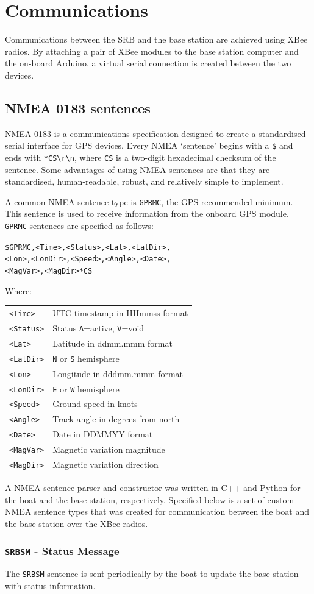 \documentclass[a4paper]{IEEEtran}
\newenvironment{nmeaspec}[1]
{
\newcommand{\field}[2]{\texttt{##1} & ##2 \\}
\vspace{0.2cm}
\noindent\texttt{#1}
\vspace{0.2cm}

\noindent Where: \vspace{0.1cm}\\  \noindent
\vspace{0.2cm}
\begin{tabular}{ll}
}
{
\end{tabular}
}
\begin{document}
\section{Communications}
Communications between the SRB and the base station are achieved using XBee radios. By attaching a pair of XBee modules to the base station computer and the on-board Arduino, a virtual serial connection is created between the two devices.

\subsection{NMEA 0183 sentences}
NMEA 0183 is a communications specification designed to create a standardised serial interface for GPS devices. Every NMEA `sentence' begins with a \texttt{\$} and ends with \texttt{*CS\textbackslash r\textbackslash n}, where \texttt{CS} is a two-digit hexadecimal checksum of the sentence. Some advantages of using NMEA sentences are that they are standardised, human-readable, robust, and relatively simple to implement. 

A common NMEA sentence type is \texttt{GPRMC}, the GPS recommended minimum. This sentence is used to receive information from the onboard GPS module. \texttt{GPRMC} sentences are specified as follows: \cite{gpsinfo}

\begin{nmeaspec}{\$GPRMC,<Time>,<Status>,<Lat>,<LatDir>,\\<Lon>,<LonDir>,<Speed>,<Angle>,<Date>,\\<MagVar>,<MagDir>*CS}
\field{<Time>}{UTC timestamp in HHmmss format}
\field{<Status>}{Status \texttt{A}=active, \texttt{V}=void}
\field{<Lat>}{Latitude in ddmm.mmm format}
\field{<LatDir>}{\texttt{N} or \texttt{S} hemisphere}
\field{<Lon>}{Longitude in dddmm.mmm format}
\field{<LonDir>}{\texttt{E} or \texttt{W} hemisphere}
\field{<Speed>}{Ground speed in knots}
\field{<Angle>}{Track angle in degrees from north}
\field{<Date>}{Date in DDMMYY format}
\field{<MagVar>}{Magnetic variation magnitude}
\field{<MagDir>}{Magnetic variation direction}
\end{nmeaspec}

A NMEA sentence parser and constructor was written in C++ and Python for the boat and the base station, respectively. Specified below is a set of custom NMEA sentence types that was created for communication between the boat and the base station over the XBee radios.

\subsubsection{\texttt{SRBSM} - Status Message}
The \texttt{SRBSM} sentence is sent periodically by the boat to update the base station with status information.
\end{document}
